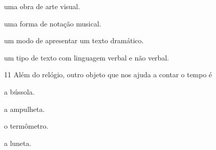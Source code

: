 \begin{minipage}{.5\textwidth}
\begin{escolha}
\item uma obra de arte visual.
  
\item uma forma de notação musical.
  
\item um modo de apresentar um texto dramático.
  
\item um tipo de texto com linguagem verbal e não verbal.
  
\end{escolha}
\end{minipage}


\num{11}
Além do relógio, outro objeto que nos ajuda a contar o tempo é


\begin{minipage}{0.5\textwidth}
\begin{escolha}
\item a bússola.

\item a ampulheta.

\item o termômetro.

\item a luneta.
\end{escolha}
\end{minipage}

